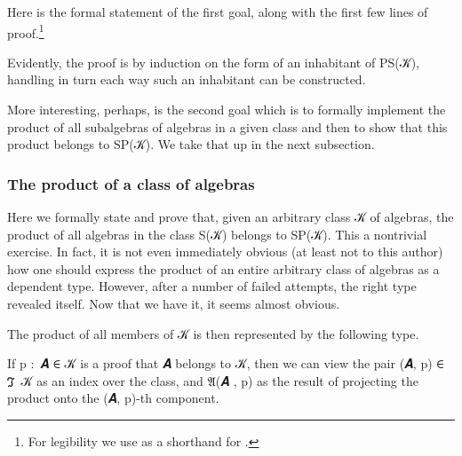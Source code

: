 \documentclass[a4paper,UKenglish,cleveref,autoref,thm-restate]{lipics-v2021}
\begin{document}
Here is the formal statement of the first goal, along with the first few lines of proof.\footnote{For legibility we use  as a shorthand for
   
   
   .}
\ccpad
\begin{code}%
  
\end{code}
\ccpad
Evidently, the proof is by induction on the form of an inhabitant of \ad P\ad S(\ab 𝒦), handling in turn each way such an inhabitant can be constructed. \seedocfordetails

More interesting, perhaps, is the second goal which is to formally implement the product of all subalgebras of algebras in a given class and then to show that this product belongs to \ad S\ad P(\ab 𝒦). We take that up in the next subsection.

\subsubsection{The product of a class of algebras}\label{sssec:the-product-of-a-class-of-algebras}
Here we formally state and prove that, given an arbitrary class \ab 𝒦 of algebras, the product of all algebras in the class \ad S(\ab 𝒦) belongs to \ad S\ad P(\ab 𝒦). This a nontrivial exercise. In fact, it is not even immediately obvious (at least not to this author) how one should express the product of an entire arbitrary class of algebras as a dependent type. However, after a number of failed attempts, the right type revealed itself. Now that we have it, it seems almost obvious.
\ccpad
\begin{code}%
  
\end{code}
\ccpad
The product of all members of 𝒦 is then represented by the following type.
\ccpad
\begin{code}
  
\end{code}
\ccpad
If \ab p \as :~\ab 𝑨 \as ∈ \ab 𝒦 is a proof that \ab 𝑨 belongs to \ab 𝒦, then we can view the pair (\ab 𝑨, \ab p) \as ∈ \af ℑ\ \ab 𝒦 as an index over the class, and \af 𝔄(\ab 𝑨 , \ab p) as the result of projecting the product %
onto the (\ab 𝑨, \ab p)-th component.
\end{document}
